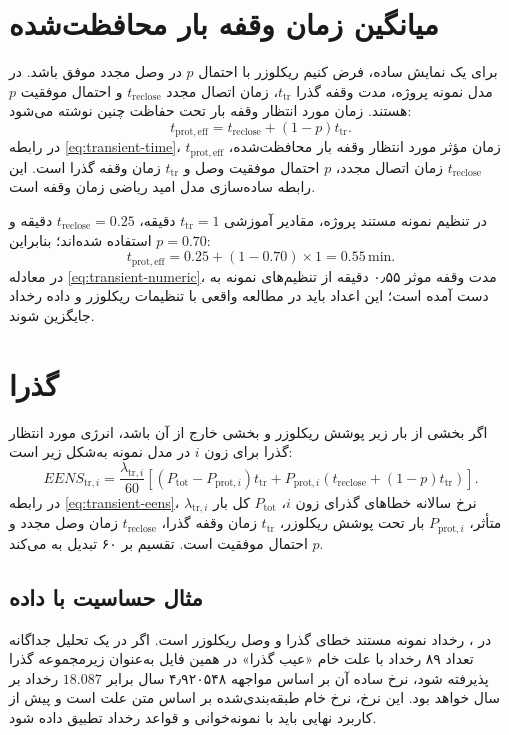 \documentclass[11pt,a4paper,oneside]{book}
\newcommand{\file}[1]{\lr{\texttt{#1}}}
\newcommand{\unit}[1]{\,\mathrm{#1}}
\begin{document}
\section{میانگین زمان وقفه بار محافظت‌شده}
برای یک نمایش ساده، فرض کنیم ریکلوزر با احتمال $p$ در وصل مجدد موفق باشد. در مدل نمونه پروژه، مدت وقفه گذرا $t_{\mathrm{tr}}$، زمان اتصال مجدد $t_{\mathrm{reclose}}$ و احتمال موفقیت $p$ هستند. زمان مورد انتظار وقفه بار تحت حفاظت چنین نوشته می‌شود:
\begin{equation}
 t_{\mathrm{prot,eff}}=t_{\mathrm{reclose}}+(1-p)t_{\mathrm{tr}}.
 \label{eq:transient-time}
\end{equation}
در رابطه \eqref{eq:transient-time}، $t_{\mathrm{prot,eff}}$ زمان مؤثر مورد انتظار وقفه بار محافظت‌شده، $t_{\mathrm{reclose}}$ زمان اتصال مجدد، $p$ احتمال موفقیت وصل و $t_{\mathrm{tr}}$ زمان وقفه گذرا است. این رابطه ساده‌سازی مدل امید ریاضی زمان وقفه است.

در تنظیم نمونه مستند پروژه، مقادیر آموزشی $t_{\mathrm{tr}}=1$ دقیقه، $t_{\mathrm{reclose}}=0.25$ دقیقه و $p=0.70$ استفاده شده‌اند؛ بنابراین:
\begin{equation}
 t_{\mathrm{prot,eff}}=0.25+(1-0.70)\times1=0.55\unit{min}.
 \label{eq:transient-numeric}
\end{equation}
در معادله \eqref{eq:transient-numeric}، مدت وقفه موثر ۰٫۵۵ دقیقه از تنظیم‌های نمونه به دست آمده است؛ این اعداد باید در مطالعه واقعی با تنظیمات ریکلوزر و داده رخداد جایگزین شوند.

\section{ گذرا}
اگر بخشی از بار زیر پوشش ریکلوزر و بخشی خارج از آن باشد، انرژی مورد انتظار گذرا برای زون $i$ در مدل نمونه به‌شکل زیر است:
\begin{equation}
 EENS_{\mathrm{tr},i}=\frac{\lambda_{\mathrm{tr},i}}{60}\left[(P_{\mathrm{tot}}-P_{\mathrm{prot},i})t_{\mathrm{tr}}+P_{\mathrm{prot},i}\left(t_{\mathrm{reclose}}+(1-p)t_{\mathrm{tr}}\right)\right].
 \label{eq:transient-eens}
\end{equation}
در رابطه \eqref{eq:transient-eens}، $\lambda_{\mathrm{tr},i}$ نرخ سالانه خطاهای گذرای زون $i$، $P_{\mathrm{tot}}$ کل بار متأثر، $P_{\mathrm{prot},i}$ بار تحت پوشش ریکلوزر، $t_{\mathrm{tr}}$ زمان وقفه گذرا، $t_{\mathrm{reclose}}$ زمان وصل مجدد و $p$ احتمال موفقیت است. تقسیم بر ۶۰ تبدیل  به  می‌کند.

\subsection{مثال حساسیت با داده \file{5.xlsx}}
در \file{5.xlsx}، رخداد  نمونه مستند خطای گذرا و وصل ریکلوزر است. اگر در یک تحلیل جداگانه تعداد ۸۹ رخداد با علت خام «عیب گذرا» در همین فایل به‌عنوان زیرمجموعه گذرا پذیرفته شود، نرخ ساده آن بر اساس مواجهه ۴٫۹۲۰۵۴۸ سال برابر $18.087$ رخداد بر سال خواهد بود. این نرخ، نرخ خام طبقه‌بندی‌شده بر اساس متن علت است و پیش از کاربرد نهایی باید با نمونه‌خوانی و قواعد رخداد تطبیق داده شود.
\end{document}
